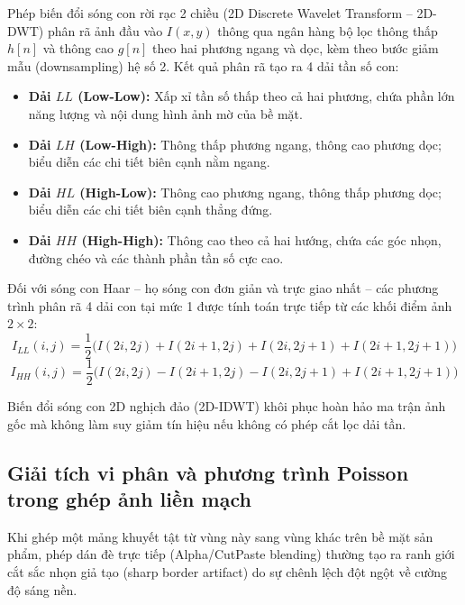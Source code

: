 Phép biến đổi sóng con rời rạc 2 chiều (2D Discrete Wavelet Transform -- 2D-DWT) phân rã ảnh đầu vào $I(x, y)$ thông qua ngân hàng bộ lọc thông thấp $h[n]$ và thông cao $g[n]$ theo hai phương ngang và dọc, kèm theo bước giảm mẫu (downsampling) hệ số 2. Kết quả phân rã tạo ra 4 dải tần số con:
\begin{itemize}
    \item \textbf{Dải $LL$ (Low-Low):} Xấp xỉ tần số thấp theo cả hai phương, chứa phần lớn năng lượng và nội dung hình ảnh mờ của bề mặt.
    \item \textbf{Dải $LH$ (Low-High):} Thông thấp phương ngang, thông cao phương dọc; biểu diễn các chi tiết biên cạnh nằm ngang.
    \item \textbf{Dải $HL$ (High-Low):} Thông cao phương ngang, thông thấp phương dọc; biểu diễn các chi tiết biên cạnh thẳng đứng.
    \item \textbf{Dải $HH$ (High-High):} Thông cao theo cả hai hướng, chứa các góc nhọn, đường chéo và các thành phần tần số cực cao.
\end{itemize}

Đối với sóng con Haar -- họ sóng con đơn giản và trực giao nhất -- các phương trình phân rã 4 dải con tại mức 1 được tính toán trực tiếp từ các khối điểm ảnh $2 \times 2$:
\begin{equation}
    I_{LL}(i, j) = \frac{1}{2}\Big(I(2i, 2j) + I(2i+1, 2j) + I(2i, 2j+1) + I(2i+1, 2j+1)\Big)
\end{equation}
\begin{equation}
    I_{HH}(i, j) = \frac{1}{2}\Big(I(2i, 2j) - I(2i+1, 2j) - I(2i, 2j+1) + I(2i+1, 2j+1)\Big)
\end{equation}

Biến đổi sóng con 2D nghịch đảo (2D-IDWT) khôi phục hoàn hảo ma trận ảnh gốc mà không làm suy giảm tín hiệu nếu không có phép cắt lọc dải tần.

\subsection{Giải tích vi phân và phương trình Poisson trong ghép ảnh liền mạch}

Khi ghép một mảng khuyết tật từ vùng này sang vùng khác trên bề mặt sản phẩm, phép dán đè trực tiếp (Alpha/CutPaste blending) thường tạo ra ranh giới cắt sắc nhọn giả tạo (sharp border artifact) do sự chênh lệch đột ngột về cường độ sáng nền.

